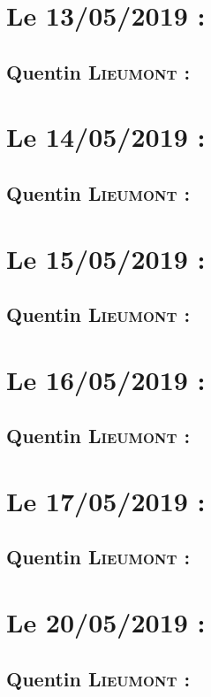 \newpage
\section{Le 13/05/2019 :}
    \subsection{Quentin \textsc{Lieumont} :}
        
\newpage
\section{Le 14/05/2019 :}
    \subsection{Quentin \textsc{Lieumont} :}
        
\newpage
\section{Le 15/05/2019 :}
    \subsection{Quentin \textsc{Lieumont} :}
        
\newpage
\section{Le 16/05/2019 :}
    \subsection{Quentin \textsc{Lieumont} :}
        
\newpage
\section{Le 17/05/2019 :}
    \subsection{Quentin \textsc{Lieumont} :}
        
\newpage
\section{Le 20/05/2019 :}
    \subsection{Quentin \textsc{Lieumont} :}
        
\newpage
